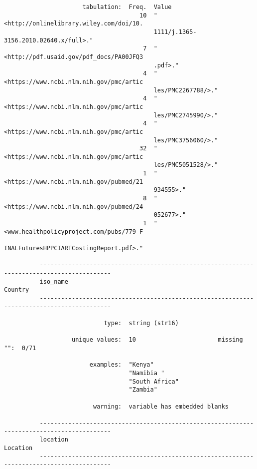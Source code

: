 \documentclass{article}
\begin{document}
\begin{verbatim}
                      tabulation:  Freq.  Value
                                      10  "<http://onlinelibrary.wiley.com/doi/10.
                                          1111/j.1365-3156.2010.02640.x/full>."
                                       7  "<http://pdf.usaid.gov/pdf_docs/PA00JFQ3
                                          .pdf>."
                                       4  "<https://www.ncbi.nlm.nih.gov/pmc/artic
                                          les/PMC2267788/>."
                                       4  "<https://www.ncbi.nlm.nih.gov/pmc/artic
                                          les/PMC2745990/>."
                                       4  "<https://www.ncbi.nlm.nih.gov/pmc/artic
                                          les/PMC3756060/>."
                                      32  "<https://www.ncbi.nlm.nih.gov/pmc/artic
                                          les/PMC5051528/>."
                                       1  "<https://www.ncbi.nlm.nih.gov/pubmed/21
                                          934555>."
                                       8  "<https://www.ncbi.nlm.nih.gov/pubmed/24
                                          052677>."
                                       1  "<www.healthpolicyproject.com/pubs/779_F
                                          INALFuturesHPPCIARTCostingReport.pdf>."
          
          ------------------------------------------------------------------------------------------
          iso_name                                                                           Country
          ------------------------------------------------------------------------------------------
          
                            type:  string (str16)
          
                   unique values:  10                       missing "":  0/71
          
                        examples:  "Kenya"
                                   "Namibia "
                                   "South Africa"
                                   "Zambia"
          
                         warning:  variable has embedded blanks
          
          ------------------------------------------------------------------------------------------
          location                                                                          Location
          ------------------------------------------------------------------------------------------
          

\end{verbatim}
\end{document}
